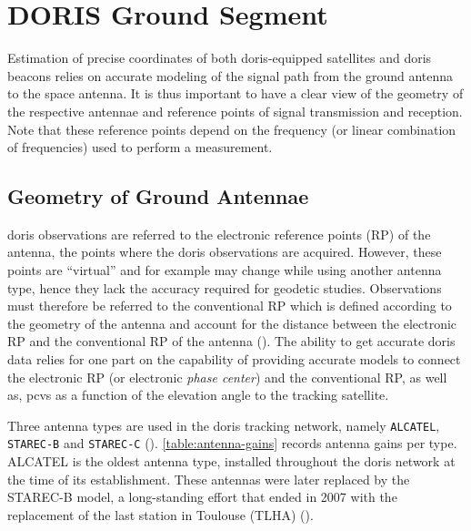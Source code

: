 \section{DORIS Ground Segment}\label{sec:doris-ground-segment}

Estimation of precise coordinates of both \gls{doris}-equipped satellites and 
\gls{doris} beacons relies on accurate modeling of the signal path from the
ground antenna to the space antenna. It is thus important to have a clear view of 
the geometry of the respective antennae and reference points of signal transmission 
and reception. Note that these reference points depend on the frequency (or linear 
combination of frequencies) used to perform a measurement.

\subsection{Geometry of Ground Antennae}\label{ssec:antenae-geometry}
\gls{doris} observations are referred to the electronic reference points (RP) of the 
antenna, the points where the \gls{doris} observations are acquired. However, 
these points are ``virtual'' and for example may change while using another antenna 
type, hence they lack the accuracy required for geodetic studies.
Observations must therefore be referred to the conventional RP which is defined 
according to the geometry of the antenna and account for the distance between 
the electronic RP and the conventional RP of the antenna (\cite{Tourain2016}). 
The ability to get accurate \gls{doris} data relies 
for one part on the capability of providing accurate models to connect the 
electronic RP (or electronic \emph{phase center}) and the conventional RP, as well 
as, \glspl{pcv} as a function of the elevation angle to the tracking satellite.

Three antenna types are used in the \gls{doris} tracking network, namely 
\texttt{ALCATEL}, \texttt{STAREC-B} and \texttt{STAREC-C} (\cite{Saunier2016}). 
\autoref{table:antenna-gains} records antenna gains per type. 
ALCATEL is the oldest antenna type, installed throughout the \gls{doris} network 
at the time of its establishment. These antennas were later replaced by the STAREC-B 
model, a long-standing effort that ended in 2007 with the replacement of the last 
station in Toulouse (TLHA) (\cite{Stepanek2022}).

